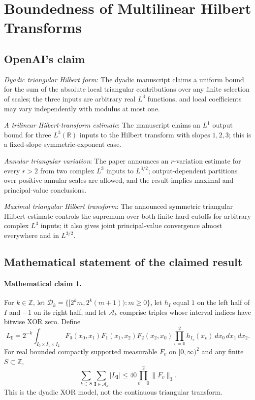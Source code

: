 \documentclass[11pt]{article}
\begin{document}
\section*{Boundedness of Multilinear Hilbert Transforms}

\subsection{OpenAI's claim}
\textit{Dyadic triangular Hilbert form}: The dyadic manuscript claims a uniform bound for the sum of the absolute local triangular contributions over any finite selection of scales; the three inputs are arbitrary real $L^3$ functions, and local coefficients may vary independently with modulus at most one.

\textit{A trilinear Hilbert-transform estimate}: The manuscript claims an $L^1$ output bound for three $L^3(\mathbb R)$ inputs to the Hilbert transform with slopes $1,2,3$; this is a fixed-slope symmetric-exponent case.

\textit{Annular triangular variation}: The paper announces an $r$-variation estimate for every $r>2$ from two complex $L^3$ inputs to $L^{3/2}$; output-dependent partitions over positive annular scales are allowed, and the result implies maximal and principal-value conclusions.

\textit{Maximal triangular Hilbert transform}: The announced symmetric triangular Hilbert estimate controls the supremum over both finite hard cutoffs for arbitrary complex $L^3$ inputs; it also gives joint principal-value convergence almost everywhere and in $L^{3/2}$.

\subsection{Mathematical statement of the claimed result}
\paragraph{Mathematical claim 1.} For $k\in\mathbb Z$, let $\mathcal D_k=\{[2^km,2^k(m+1)):m\ge0\}$, let $h_I$ equal $1$ on the left half of $I$ and $-1$ on its right half, and let $\mathcal A_k$ comprise triples whose interval indices have bitwise XOR zero. Define \[L_{\mathbf I}=2^{-k}\int_{I_0\times I_1\times I_2}F_0(x_0,x_1)F_1(x_1,x_2)F_2(x_2,x_0)\prod_{v=0}^2h_{I_v}(x_v)\,dx_0\,dx_1\,dx_2.\] For real bounded compactly supported measurable $F_v$ on $[0,\infty)^2$ and any finite $S\subset\mathbb Z$, \[\sum_{k\in S}\sum_{\mathbf I\in\mathcal A_k}|L_{\mathbf I}|\le40\prod_{v=0}^2\|F_v\|_3.\] This is the dyadic XOR model, not the continuous triangular transform.
\end{document}
